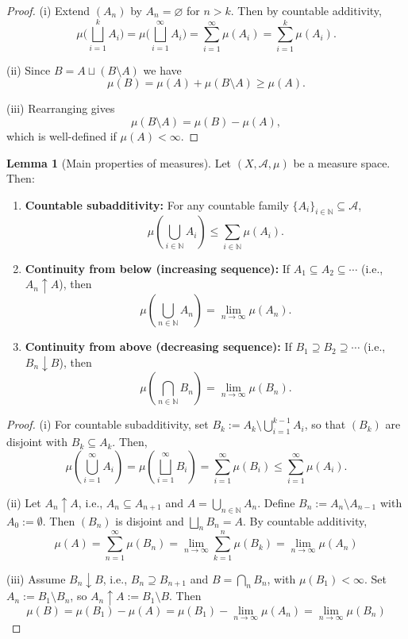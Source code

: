 \documentclass[12pt]{article}
\theoremstyle{definition}
\newtheorem{lemma}[theorem]{Lemma}
\begin{document}
\begin{proof}
(i) Extend \((A_n)\) by \(A_n = \varnothing\) for \(n > k\). Then by countable additivity,
\[
\mu\big(\bigsqcup_{i=1}^k A_i\big) = \mu\big(\bigsqcup_{i=1}^\infty A_i\big) = \sum_{i=1}^\infty \mu(A_i) = \sum_{i=1}^k \mu(A_i).
\]

(ii) Since \(B = A \sqcup (B \setminus A)\) we have
\[
\mu(B) = \mu(A) + \mu(B \setminus A) \geq \mu(A).
\]

(iii) Rearranging gives
\[
\mu(B \setminus A) = \mu(B) - \mu(A),
\]
which is well-defined if \(\mu(A) < \infty\).
\end{proof}


\medskip
\begin{lemma}[Main properties of measures]
Let \((X, \mathcal{A}, \mu)\) be a measure space. Then:
\medskip
\begin{enumerate}
    \item[(i)] \textbf{Countable subadditivity:} For any countable family \(\{A_i\}_{i \in \mathbb{N}} \subseteq \mathcal{A}\),
    \[
    \mu\left( \bigcup_{i \in \mathbb{N}} A_i \right) \leq \sum_{i \in \mathbb{N}} \mu(A_i).
    \]

    \item[(ii)] \textbf{Continuity from below (increasing sequence):} If \(A_1 \subseteq A_2 \subseteq \cdots\) (i.e., \(A_n \uparrow A\)), then
    \[
    \mu\left( \bigcup_{n \in \mathbb{N}} A_n \right) = \lim_{n \to \infty} \mu(A_n).
    \]

    \item[(iii)] \textbf{Continuity from above (decreasing sequence):} If \(B_1 \supseteq B_2 \supseteq \cdots\) (i.e., \(B_n \downarrow B\)), then
    \[
    \mu\left( \bigcap_{n \in \mathbb{N}} B_n \right) = \lim_{n \to \infty} \mu(B_n).
    \]
\end{enumerate}
\end{lemma}

\medskip
\begin{proof}
(i) For countable subadditivity, set \(B_k := A_k \setminus \bigcup_{i=1}^{k-1} A_i\), so that \((B_k)\) are disjoint with \(B_k \subseteq A_k\). Then,
\[
\mu\left(\bigcup_{i=1}^\infty A_i\right) = \mu\left(\bigsqcup_{i=1}^\infty B_i\right) = \sum_{i=1}^\infty \mu(B_i) \leq \sum_{i=1}^\infty \mu(A_i).
\]

\vspace{3em}
(ii) Let \( A_n \uparrow A \), i.e., \( A_n \subseteq A_{n+1} \) and \( A = \bigcup_{n \in \mathbb{N}} A_n \). Define \( B_n := A_n \setminus A_{n-1} \) with \( A_0 := \emptyset \). Then \( (B_n) \) is disjoint and \( \bigsqcup_{n} B_n = A \). By countable additivity,
\[
\mu(A) = \sum_{n=1}^\infty \mu(B_n) = \lim_{n \to \infty} \sum_{k=1}^n \mu(B_k) = \lim_{n \to \infty} \mu(A_n) 
\]

\vspace{3em}
(iii) Assume \(B_n \downarrow B\), i.e., \(B_n \supseteq B_{n+1}\) and \(B = \bigcap_{n} B_n\), with \(\mu(B_1) < \infty\). Set \(A_n := B_1 \setminus B_n\), so \(A_n \uparrow A := B_1 \setminus B\). Then
\[
\mu(B) = \mu(B_1) - \mu(A) = \mu(B_1) - \lim_{n \to \infty} \mu(A_n) = \lim_{n \to \infty} \mu(B_n)
\]
\end{proof}
\end{document}
